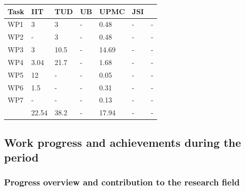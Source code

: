 \documentclass[12pt,a4paper,twoside]{article}
\begin{document}
\begin{longtable}{|C{1.5cm}|C{1.5cm}|C{1.5cm}|C{2cm}|C{2cm}|C{2cm}|C{2cm}|}
\footnotesize \textbf{Task}& \footnotesize \textbf{IIT}&\footnotesize \textbf{TUD}&\footnotesize \textbf{UB}& \footnotesize \textbf{UPMC} &\footnotesize \textbf{JSI} &  \\ \hline
\footnotesize WP1 &  3          &  3   &  -   &  0.48   &  -   &  -   \\  \hline
\footnotesize WP2 &  -           &  3   &  -   &  0.48   &  -   &  -   \\  \hline
\footnotesize WP3 &  3          &  10.5   &  -   &  14.69   &  -   &  -   \\  \hline
\footnotesize WP4 &  3.04     &  21.7   &  -   &  1.68   &  -   &  -   \\  \hline
\footnotesize WP5 &  12        &  -   &  -   &  0.05   &  -   &  -   \\  \hline
\footnotesize WP6 &  1.5       &  -   &  -   &  0.31   &  -   &  -   \\  \hline
\footnotesize WP7 &  -           &  -   &  -   &  0.13   &  -   &  -   \\  \hline
{}  & 22.54 & 38.2 & - & 17.94 & - & - \\  
\end{longtable}










\subsection{Work progress and achievements during the period}

\subsubsection{Progress overview and contribution to the research field}
\end{document}
